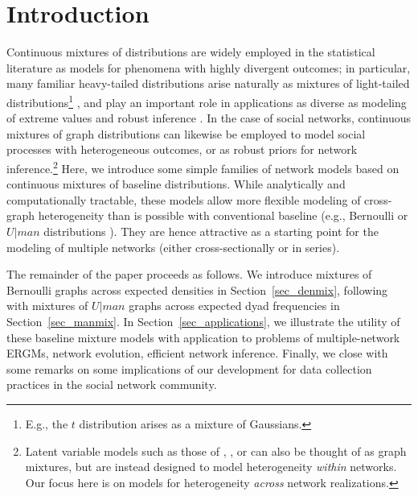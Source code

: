 \documentclass[11pt]{article}
\begin{document}
\theoremstyle{definition}                 %
\newtheorem{definition}{Definition}
\newtheorem{hypothesis}{Hypothesis}
\newtheorem{conjecture}{Conjecture}
\newtheorem{example}{Example}

\theoremstyle{remark}                    %
\newtheorem{remark}{Remark}

\section{Introduction}

Continuous mixtures of distributions are widely employed in the statistical literature as models for phenomena with highly divergent outcomes; in particular, many familiar heavy-tailed distributions arise naturally as mixtures of light-tailed distributions\footnote{E.g., the $t$ distribution arises as a mixture of Gaussians.} \citep{johnson.et.al:bk:1994,johnson.et.al:bk:1995}, and play an important role in applications as diverse as modeling of extreme values and robust inference \cite{gelman.et.al:bk:2003}.  In the case of social networks, continuous mixtures of graph distributions can likewise be employed to model social processes with heterogeneous outcomes, or as robust priors for network inference.\footnote{Latent variable models such as those of \citet{hoff.et.al:jasa:2002}, \citet{handcock.et.al:jrssA:2007}, or \citet{nowicki.snijders:jasa:2001} can also be thought of as graph mixtures, but are instead designed to model heterogeneity \emph{within} networks.  Our focus here is on models for heterogeneity \emph{across} network realizations.}  Here, we introduce some simple families of network models based on continuous mixtures of baseline distributions.  While analytically and computationally tractable, these models allow more flexible modeling of cross-graph heterogeneity than is possible with conventional baseline (e.g., Bernoulli or $U|man$ distributions \citep{wasserman.faust:bk:1994}).  They are hence attractive as a starting point for the modeling of multiple networks (either cross-sectionally or in series).

The remainder of the paper proceeds as follows.  We introduce mixtures of Bernoulli graphs across expected densities in Section~\ref{sec_denmix}, following with mixtures of $U|man$ graphs across expected dyad frequencies in Section~\ref{sec_manmix}.  In Section~\ref{sec_applications}, we illustrate the utility of these baseline mixture models with application to problems of multiple-network ERGMs, network evolution, efficient network inference.  Finally, we close with some remarks on some implications of our development for data collection practices in the social network community. 
\end{document}
